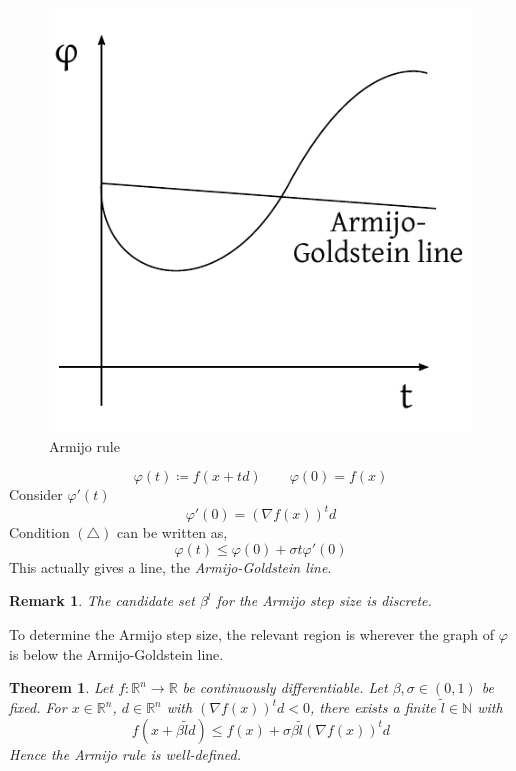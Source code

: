 \documentclass[a4paper]{article}
\newcounter{lecref}[subsection]
\numberwithin{lecref}{subsection}
\newtheorem{theorem}[lecref]{Theorem}
\newtheorem*{Remark}{Remark}
\begin{document}
\begin{figure}[t]
	\begin{center}
		\includegraphics{img/30_armijo.pdf}
		\caption{Armijo rule}
		\label{img:armijo}
	\end{center}
\end{figure}

\[ \varphi(t) \coloneqq f(x + td) \qquad \varphi(0) = f(x) \]
Consider $\varphi'(t)$
\[ \varphi'(0) = \left(\nabla f(x)\right)^t d \]
Condition $(\triangle)$ can be written as,
\[ \varphi(t) \leq \varphi(0) + \sigma t \varphi'(0)  \]
This actually gives a line, the \emph{Armijo-Goldstein line}.

\begin{Remark}
	The candidate set $\beta^l$ for the Armijo step size is discrete.
\end{Remark}

To determine the Armijo step size, the relevant region is wherever the graph of $\varphi$ is below the Armijo-Goldstein line.

\begin{theorem}
	\label{theorem:5.4.1}
	Let $f: \mathbb R^n \to \mathbb R$ be continuously differentiable.
	Let $\beta, \sigma \in (0,1)$ be fixed. For $x \in \mathbb R^n$, $d \in \mathbb R^n$ with $(\nabla f(x))^t d < 0$,
	there exists a finite $\tilde l \in \mathbb N$ with
	\[ f(x + \beta \tilde l d) \leq f(x) + \sigma \beta \tilde l (\nabla f(x))^t d \]
	Hence the Armijo rule is well-defined.
\end{theorem}
\end{document}
